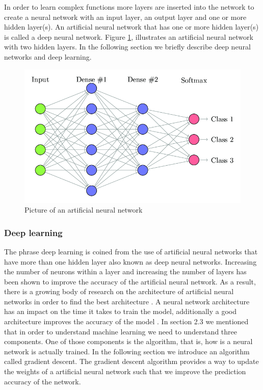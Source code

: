 \documentclass[a4paper,11pt]{article}
\begin{document}
In order to learn complex functions more layers are inserted into the network to create a neural network with an input layer, an output layer and one or more hidden layer(s). An artificial neural network that has one or more hidden layer(s) is called a deep neural network. Figure \ref{fig: ANN}, illustrates an artificial neural network with two hidden layers. In the following section we briefly describe deep neural networks and deep learning.

 \begin{figure}[!htbp]
  \includegraphics[scale=0.5]{ANN.png} 
  \caption{Picture of an artificial neural network \citep{Pelletier} }
  \label{fig: ANN} 
 \end{figure}

\subsubsection{Deep learning}
\label{deepLearning}
The phrase deep learning is coined from the use of artificial neural networks that have more than one hidden layer also known as deep neural networks. Increasing the number of neurons within a layer and increasing the number of layers has been shown to improve the accuracy of the artificial neural network. As a result, there is a growing body of research on the architecture of artificial neural networks in order to find the best architecture \citep{Alzubaidi}. A neural network  architecture has an impact on the time it takes to train the model, additionally a good architecture improves the accuracy of the model \citep{John}. In section 2.3 we mentioned that in order to understand machine learning we need to understand three components. One of those components is the algorithm, that is, how is a neural network is actually trained. In the following section we introduce an algorithm called gradient descent. The gradient descent algorithm provides a way to update the weights of a artificial neural network such that we improve the prediction accuracy of the network. 
\end{document}
